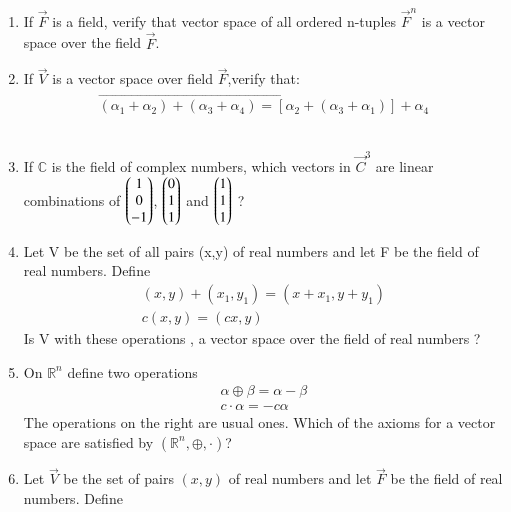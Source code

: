 \renewcommand{\theequation}{\theenumi}
\renewcommand{\thefigure}{\theenumi}
\begin{enumerate}[label=\thesubsection.\arabic*.,ref=\thesubsection.\theenumi]

\item If $\vec{F}$ is a field, verify that vector space of all ordered n-tuples $\vec{F}^n$ is a 
vector space over the field $\vec{F}$.
%
\\
\solution

\item If $\vec{V}$ is a vector space over field $\vec{F}$,verify that: \begin{align}
\vec{(\alpha_1+\alpha_2)+(\alpha_3+\alpha_4)=[\alpha_2+(\alpha_3+\alpha_1)]+\alpha_4 }
\end{align}
%
\\
\solution

%
\item If $\mathbb{C}$ is the field of complex numbers, which vectors in $\vec{C}^{3}$ are linear combinations of $\begin{pmatrix}1\\0\\-1\end{pmatrix}$, $\begin{pmatrix}0\\1\\1\end{pmatrix}$ and $\begin{pmatrix}1\\1\\1\end{pmatrix}$ ?
%
\\
\solution

%
\item Let V be the set of all pairs (x,y) of real numbers and let F be the field of real numbers. Define 
\begin{align}
(x,y)+(x_1,y_1)=(x+x_1,y+y_1)\\
c(x,y)=(cx,y)
\end{align}
Is V with these operations , a vector space over the field of real numbers ?
%
\\
\solution

%
\item On $\mathbb{R}^n$  define two operations
\begin{align}
\alpha\oplus\beta=\alpha-\beta\\
c\cdot\alpha=-c\alpha
\end{align}
The operations on the right are usual ones. Which of the axioms for a vector space are satisfied by $(\mathbb{R}^n,\oplus,\cdot)$?
%
\\
\solution

\item Let $\vec{V}$ be the  set of pairs $(x,y)$ of real numbers and let $\vec{F}$ be the field of real numbers. Define

\end{enumerate}

